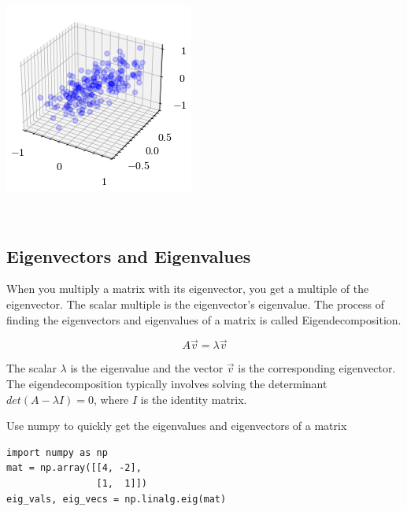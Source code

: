 \documentclass[openany]{book}
\begin{document}
    \begin{center}
    \includegraphics[width=\textwidth]{combined_files/combined_46_0.png}
    \end{center}
    { \hspace*{\fill} \\}
    
    \subsection{Eigenvectors and
Eigenvalues}\label{eigenvectors-and-eigenvalues}

When you multiply a matrix with its eigenvector, you get a multiple of
the eigenvector. The scalar multiple is the eigenvector's eigenvalue.
The process of finding the eigenvectors and eigenvalues of a matrix is
called Eigendecomposition.

\[A \vec{v} = \lambda \vec{v}\]

The scalar \(\lambda\) is the eigenvalue and the vector \(\vec{v}\) is
the corresponding eigenvector. The eigendecomposition typically involves
solving the determinant \(det(A - \lambda I) = 0\), where \(I\) is the
identity matrix.

Use numpy to quickly get the eigenvalues and eigenvectors of a matrix

\begin{tcolorbox}
\tiny
\begin{verbatim}
import numpy as np
mat = np.array([[4, -2],
                [1,  1]])
eig_vals, eig_vecs = np.linalg.eig(mat)
\end{verbatim}
\end{tcolorbox}
\end{document}
